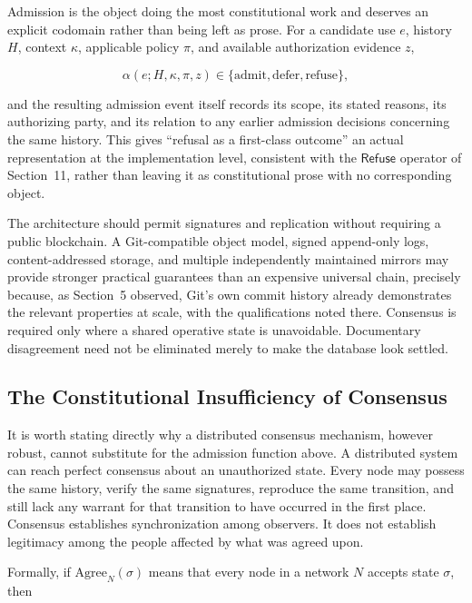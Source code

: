 \documentclass[11pt,oneside]{article}
\theoremstyle{plain}
\theoremstyle{definition}
\newcommand{\Refuse}{\mathsf{Refuse}}
\begin{document}
Admission is the object doing the most constitutional work and deserves an explicit codomain rather than being left as prose. For a candidate use $e$, history $H$, context $\kappa$, applicable policy $\pi$, and available authorization evidence $z$,

\begin{equation}
\alpha(e; H, \kappa, \pi, z) \in \{\mathrm{admit}, \mathrm{defer}, \mathrm{refuse}\},
\end{equation}

and the resulting admission event itself records its scope, its stated reasons, its authorizing party, and its relation to any earlier admission decisions concerning the same history. This gives \enquote{refusal as a first-class outcome} an actual representation at the implementation level, consistent with the $\Refuse$ operator of Section~11, rather than leaving it as constitutional prose with no corresponding object.

The architecture should permit signatures and replication without requiring a public blockchain. A Git-compatible object model, signed append-only logs, content-addressed storage, and multiple independently maintained mirrors may provide stronger practical guarantees than an expensive universal chain, precisely because, as Section~5 observed, Git's own commit history already demonstrates the relevant properties at scale, with the qualifications noted there. Consensus is required only where a shared operative state is unavoidable. Documentary disagreement need not be eliminated merely to make the database look settled.

\subsection{The Constitutional Insufficiency of Consensus}

It is worth stating directly why a distributed consensus mechanism, however robust, cannot substitute for the admission function above. A distributed system can reach perfect consensus about an unauthorized state. Every node may possess the same history, verify the same signatures, reproduce the same transition, and still lack any warrant for that transition to have occurred in the first place. Consensus establishes synchronization among observers. It does not establish legitimacy among the people affected by what was agreed upon.

Formally, if $\mathrm{Agree}_N(\sigma)$ means that every node in a network $N$ accepts state $\sigma$, then
\end{document}
